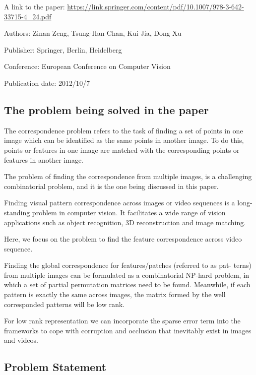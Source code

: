 \documentclass[fleqn, 11pt]{article}
\begin{document}
A link to the paper: \url{https://link.springer.com/content/pdf/10.1007/978-3-642-33715-4_24.pdf}

Authors: Zinan Zeng, Tsung-Han Chan, Kui Jia, Dong Xu

Publisher: Springer, Berlin, Heidelberg

Conference: European Conference on Computer Vision

Publication date: 2012/10/7

\subsection*{The problem being solved in the paper}

The correspondence problem refers to the task of finding a set of points 
in one image which can be identified as the same points in another image. 
To do this, points or features in one image are matched with the 
corresponding points or features in another image. 

\smallskip

The problem of finding the correspondence from multiple images, is a challenging combinatorial problem, and
it is the one being discussed in this paper.

\smallskip

Finding visual pattern correspondence across images or video sequences is a
long-standing problem in computer vision. It facilitates a wide range of vision
applications such as object recognition, 3D reconstruction and image
matching.

\smallskip

Here, we focus on the problem to find the feature correspondence across video sequence. 

\smallskip

Finding the global correspondence for features/patches (referred to as pat-
terns) from multiple images can be formulated as a combinatorial NP-hard problem, 
in which a set of partial permutation matrices need to be found. Meanwhile,
if each pattern is exactly the same across images, the matrix formed by the well
corresponded patterns will be low rank. 

\smallskip

For low rank representation we can incorporate
the sparse error term into the frameworks to cope with corruption and occlusion 
that inevitably exist in images and videos.

\smallskip

\subsection*{Problem Statement}
\end{document}
